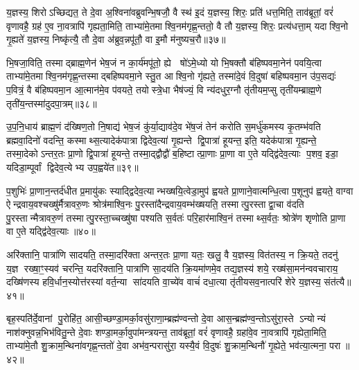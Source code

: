 {\anuvakamend[{ए॒ष चैन्द्रवाय॒वो द्वाविꣳ॑शतिश्च॥८॥}]}

य॒ज्ञस्य॒ शिरोऽच्छिद्यत॒ ते दे॒वा अ॒श्विना॑वब्रुवन्भि॒षजौ॒ वै स्थ॑ इ॒दं य॒ज्ञस्य॒ शिरः॒ प्रति॑ धत्त॒मिति॒ ताव॑ब्रूतां॒ वरं॑ वृणावहै॒ ग्रह॑ ए॒व ना॒वत्रापि॑ गृह्यता॒मिति॒ ताभ्या॑मे॒तमाश्वि॒नम॑गृह्ण॒न्ततो॒ वै तौ य॒ज्ञस्य॒ शिरः॒ प्रत्य॑धत्ता॒म् यदाश्वि॒नो गृ॒ह्यते॑ य॒ज्ञस्य॒ निष्कृ॑त्यै॒ तौ दे॒वा अ॑ब्रुव॒न्नपू॑तौ॒ वा इ॒मौ म॑नुष्यच॒रौ॥३७॥

भि॒षजा॒विति॒ तस्माद्ब्राह्म॒णेन॑ भेष॒जं न का॒र्य॑मपू॑तो॒ ह्ये  षो॑ऽमे॒ध्यो यो भि॒षक्तौ ब॑हिष्पवमा॒नेन॑ पवयि॒त्वा ताभ्या॑मे॒तमाश्वि॒नम॑गृह्ण॒न्तस्माद्बहिष्पवमा॒ने स्तु॒त आश्वि॒नो गृ॑ह्यते॒ तस्मा॑दे॒वं वि॒दुषा॑ बहिष्पवमा॒न उ॑प॒सद्यः॑ प॒वित्रं॒ वै ब॑हिष्पवमा॒न आ॒त्मान॑मे॒व प॑वयते॒ तयोस्त्रे॒धा भैष॑ज्यं॒ वि न्य॑दधुर॒ग्नौ तृ॑तीयम॒प्सु तृती॑यम्ब्राह्म॒णे तृती॑य॒न्तस्मा॑दुदपा॒त्रम्॥३८॥

उ॒प॒नि॒धाय॑ ब्राह्म॒णं द॑ख्षिण॒तो नि॒षाद्य॑ भेष॒जं कु॑र्या॒द्याव॑दे॒व भे॑ष॒जं तेन॑ करोति स॒मर्धु॑कमस्य कृ॒तम्भ॑वति ब्रह्मवा॒दिनो॑ वदन्ति॒ कस्माथ्स॒त्यादेक॑पात्रा द्विदेव॒त्या॑ गृ॒ह्यन्ते द्वि॒पात्रा॑ हूयन्त॒ इति॒ यदेक॑पात्रा गृ॒ह्यन्ते॒ तस्मा॒देकोऽन्तर॒तः प्रा॒णो द्वि॒पात्रा॑ हूयन्ते॒ तस्मा॒द्द्वौद्वौ॑ ब॒हिष्टात्प्रा॒णाः प्रा॒णा वा ए॒ते यद्द्वि॑देव॒त्याः प॒शव॒ इडा॒ यदिडा॒म्पूर्वां द्विदेव॒त्येभ्य उप॒ह्वये॑त॥३९॥

प॒शुभिः॑ प्रा॒णान॒न्तर्द॑धीत प्र॒मायु॑कः स्याद्द्विदेव॒त्यान्भख्षयि॒त्वेडा॒मुप॑ ह्वयते प्रा॒णाने॒वात्मन्धि॒त्वा प॒शूनुप॑ ह्वयते॒ वाग्वा ऐन्द्रवाय॒वश्चख्षु॑र्मैत्रावरु॒णः श्रोत्र॑माश्वि॒नः पु॒रस्ता॑दैन्द्रवाय॒वम्भ॑ख्षयति॒ तस्मात्पु॒रस्ताद्वा॒चा व॑दति पु॒रस्तान्मैत्रावरु॒णं तस्मात्पु॒रस्ता॒च्चख्षु॑षा पश्यति स॒र्वतः॑ परि॒हार॑माश्वि॒नं तस्माथ्स॒र्वतः॒ श्रोत्रे॑ण शृणोति प्रा॒णा वा ए॒ते यद्द्वि॑देव॒त्याः॥४०॥

अरि॑क्तानि॒ पात्रा॑णि सादयति॒ तस्मा॒दरि॑क्ता अन्तर॒तः प्रा॒णा यतः॒ खलु॒ वै य॒ज्ञस्य॒ वित॑तस्य॒ न क्रि॒यते॒ तदनु॑ य॒ज्ञ रख्षा॒ꣳ॒स्यव॑ चरन्ति॒ यदरि॑क्तानि॒ पात्रा॑णि सा॒दय॑ति क्रि॒यमा॑णमे॒व तद्य॒ज्ञस्य॑ शये॒ रख्ष॑सा॒मन॑न्ववचाराय॒ दख्षि॑णस्य हवि॒र्धान॒स्योत्त॑रस्यां वर्त॒न्या सा॑दयति वा॒च्ये॑व वाचं॑ दधा॒त्या तृ॑तीयसव॒नात्परि॑ शेरे य॒ज्ञस्य॒ संत॑त्यै॥४१॥

{\anuvakamend[{म॒नु॒ष्य॒च॒रावु॑दपा॒त्रमु॑प॒ह्वये॑त द्विदेव॒त्याः षट्च॑त्वारिशच्च॥९॥}]}

बृह॒स्पति॑र्दे॒वानां पु॒रोहि॑त॒ आसी॒च्छण्डा॒मर्का॒वसु॑राणा॒म्ब्रह्म॑ण्वन्तो दे॒वा आस॒न्ब्रह्म॑ण्व॒न्तोऽसु॑रा॒स्ते ऽन्योन्यं नाश॑क्नुवन्न॒भिभ॑वितु॒न्ते दे॒वाः शण्डा॒मर्का॒वुपा॑मन्त्रयन्त॒ ताव॑ब्रूतां॒ वरं॑ वृणावहै॒ ग्रहा॑वे॒व ना॒वत्रापि॑ गृह्येता॒मिति॒ ताभ्या॑मे॒तौ शु॒क्राम॒न्थिना॑वगृह्ण॒न्ततो॑ दे॒वा अभ॑व॒न्परासु॑रा॒ यस्यै॒वं वि॒दुषः॑ शु॒क्राम॒न्थिनौ॑ गृ॒ह्येते॒ भव॑त्या॒त्मना॒ परा॥४२॥

